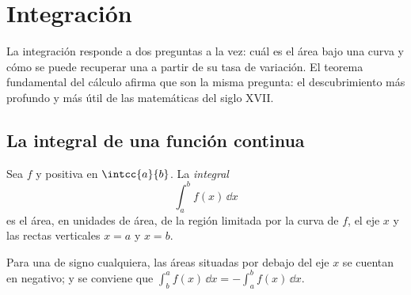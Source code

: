 \chapter{Integración}\label{ch:g12:integ}

La integración responde a dos preguntas a la vez: cuál es el área bajo una
curva y cómo se puede recuperar una  a partir de su tasa de
variación. El teorema fundamental del cálculo afirma que son la misma
pregunta: el descubrimiento más profundo y más útil de las matemáticas del
siglo XVII.

\section{La integral de una función continua}

\begin{definition}\label{def:g12:integ:area}
Sea $f$  y positiva en $\intcc{a}{b}$. La
\emph{integral}
\[
\int_a^b f(x)\,\dd x
\]
es el área, en unidades de área, de la región limitada por la curva de $f$,
el eje $x$ y las rectas verticales $x = a$ y $x = b$.
\end{definition}

\begin{omfigure}
\end{omfigure}

Para una  de signo cualquiera, las áreas situadas por debajo del eje
$x$ se cuentan en negativo; y se conviene que
$\int_b^a f(x)\,\dd x = -\int_a^b f(x)\,\dd x$.

